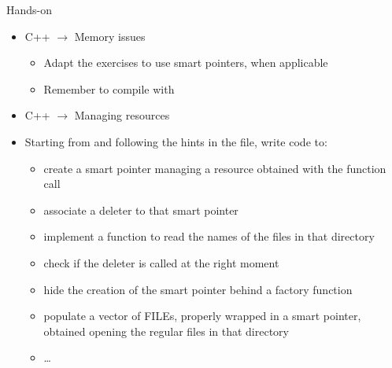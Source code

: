 \begin{frame}{Hands-on}
  \begin{itemize}
  \item C++ $\rightarrow$ Memory issues
    \begin{itemize}
    \item Adapt the exercises to use smart pointers, when applicable
    \item Remember to compile with 
    \end{itemize}
  \item C++ $\rightarrow$ Managing resources
  \item Starting from  and following the hints in the file, write
    code to:
    \begin{itemize}
    \item create a smart pointer managing a  resource obtained with
      the  function call
    \item associate a deleter to that smart pointer
    \item implement a function to read the names of the files in that directory
    \item check if the deleter is called at the right moment
    \item hide the creation of the smart pointer behind a factory function
    \item populate a vector of FILEs, properly wrapped in a smart pointer,
      obtained opening the regular files in that directory
    \item \ldots
    \end{itemize}
  \end{itemize}
\end{frame}

